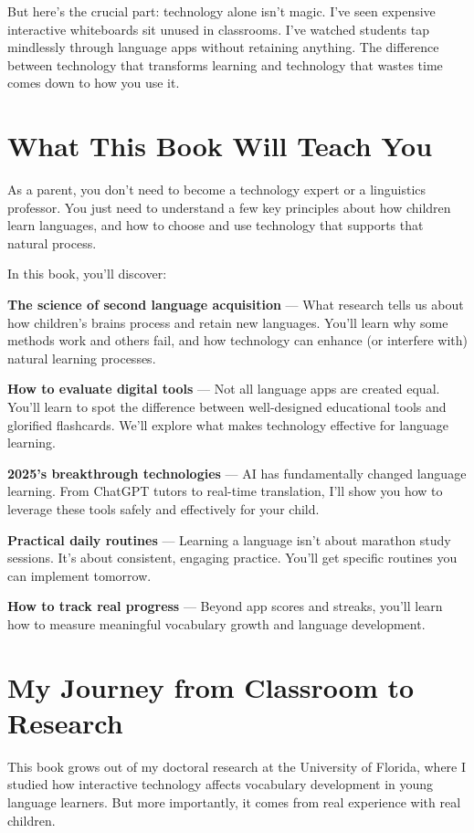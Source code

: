 \documentclass[11pt,oneside]{book}
\begin{document}
But here's the crucial part: technology alone isn't magic. I've seen expensive interactive whiteboards sit unused in classrooms. I've watched students tap mindlessly through language apps without retaining anything. The difference between technology that transforms learning and technology that wastes time comes down to how you use it.

\section*{What This Book Will Teach You}

As a parent, you don't need to become a technology expert or a linguistics professor. You just need to understand a few key principles about how children learn languages, and how to choose and use technology that supports that natural process.

In this book, you'll discover:

\textbf{The science of second language acquisition} — What research tells us about how children's brains process and retain new languages. You'll learn why some methods work and others fail, and how technology can enhance (or interfere with) natural learning processes.

\textbf{How to evaluate digital tools} — Not all language apps are created equal. You'll learn to spot the difference between well-designed educational tools and glorified flashcards. We'll explore what makes technology effective for language learning.

\textbf{2025's breakthrough technologies} — AI has fundamentally changed language learning. From ChatGPT tutors to real-time translation, I'll show you how to leverage these tools safely and effectively for your child.

\textbf{Practical daily routines} — Learning a language isn't about marathon study sessions. It's about consistent, engaging practice. You'll get specific routines you can implement tomorrow.

\textbf{How to track real progress} — Beyond app scores and streaks, you'll learn how to measure meaningful vocabulary growth and language development.

\section*{My Journey from Classroom to Research}

This book grows out of my doctoral research at the University of Florida, where I studied how interactive technology affects vocabulary development in young language learners. But more importantly, it comes from real experience with real children.
\end{document}
